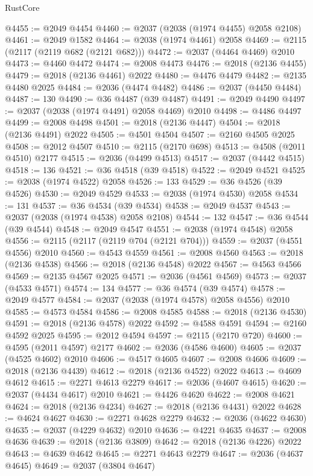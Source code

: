 \begin{lexlean}{RustCore}
\begin{coremodule}
@4455 := @2049 @4454
@4460 := @2037 (@2038 (@1974 @4455) @2058 @2108)
@4461 := @2049 @1582
@4464 := @2038 (@1974 @4461) @2058
@4469 := @2115 (@2117 (@2119 @682 (@2121 @682)))
@4472 := @2037 (@4464 @4469) @2010
@4473 := @4460 @4472
@4474 := @2008 @4473
@4476 := @2018 (@2136 @4455)
@4479 := @2018 (@2136 @4461) @2022
@4480 := @4476 @4479
@4482 := @2135 @4480 @2025
@4484 := @2036 (@4474 @4482)
@4486 := @2037 (@4450 @4484)
@4487 := 130
@4490 := @36 @4487 (@39 @4487)
@4491 := @2049 @4490
@4497 := @2037 (@2038 (@1974 @4491) @2058 @4469) @2010
@4498 := @4486 @4497
@4499 := @2008 @4498
@4501 := @2018 (@2136 @4447)
@4504 := @2018 (@2136 @4491) @2022
@4505 := @4501 @4504
@4507 := @2160 @4505 @2025
@4508 := @2012 @4507
@4510 := @2115 (@2170 @698)
@4513 := @4508 (@2011 @4510) @2177
@4515 := @2036 (@4499 @4513)
@4517 := @2037 (@4442 @4515)
@4518 := 136
@4521 := @36 @4518 (@39 @4518)
@4522 := @2049 @4521
@4525 := @2038 (@1974 @4522) @2058
@4526 := 133
@4529 := @36 @4526 (@39 @4526)
@4530 := @2049 @4529
@4533 := @2038 (@1974 @4530) @2058
@4534 := 131
@4537 := @36 @4534 (@39 @4534)
@4538 := @2049 @4537
@4543 := @2037 (@2038 (@1974 @4538) @2058 @2108)
@4544 := 132
@4547 := @36 @4544 (@39 @4544)
@4548 := @2049 @4547
@4551 := @2038 (@1974 @4548) @2058
@4556 := @2115 (@2117 (@2119 @704 (@2121 @704)))
@4559 := @2037 (@4551 @4556) @2010
@4560 := @4543 @4559
@4561 := @2008 @4560
@4563 := @2018 (@2136 @4538)
@4566 := @2018 (@2136 @4548) @2022
@4567 := @4563 @4566
@4569 := @2135 @4567 @2025
@4571 := @2036 (@4561 @4569)
@4573 := @2037 (@4533 @4571)
@4574 := 134
@4577 := @36 @4574 (@39 @4574)
@4578 := @2049 @4577
@4584 := @2037 (@2038 (@1974 @4578) @2058 @4556) @2010
@4585 := @4573 @4584
@4586 := @2008 @4585
@4588 := @2018 (@2136 @4530)
@4591 := @2018 (@2136 @4578) @2022
@4592 := @4588 @4591
@4594 := @2160 @4592 @2025
@4595 := @2012 @4594
@4597 := @2115 (@2170 @720)
@4600 := @4595 (@2011 @4597) @2177
@4602 := @2036 (@4586 @4600)
@4605 := @2037 (@4525 @4602) @2010
@4606 := @4517 @4605
@4607 := @2008 @4606
@4609 := @2018 (@2136 @4439)
@4612 := @2018 (@2136 @4522) @2022
@4613 := @4609 @4612
@4615 := @2271 @4613 @2279
@4617 := @2036 (@4607 @4615)
@4620 := @2037 (@4434 @4617) @2010
@4621 := @4426 @4620
@4622 := @2008 @4621
@4624 := @2018 (@2136 @4234)
@4627 := @2018 (@2136 @4431) @2022
@4628 := @4624 @4627
@4630 := @2271 @4628 @2279
@4632 := @2036 (@4622 @4630)
@4635 := @2037 (@4229 @4632) @2010
@4636 := @4221 @4635
@4637 := @2008 @4636
@4639 := @2018 (@2136 @3809)
@4642 := @2018 (@2136 @4226) @2022
@4643 := @4639 @4642
@4645 := @2271 @4643 @2279
@4647 := @2036 (@4637 @4645)
@4649 := @2037 (@3804 @4647)

\end{coremodule}
\end{lexlean}
